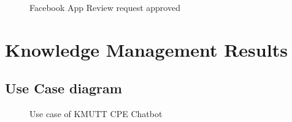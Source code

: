 \documentclass[12pt,oneside,openright,a4paper]{cpe-english-project}
\begin{document}
	\begin{figure}[!h]\centering
		\caption{Facebook App Review request approved}\label{fig:app_review_approved}
	\end{figure}

\pagebreak
\section{Knowledge Management Results}
	\subsection{Use Case diagram}
	\begin{figure}[!h]\centering
		\caption{Use case of KMUTT CPE Chatbot}\label{fig:Use case of KMUTT CPE Chatbot version2}
	\end{figure}
\pagebreak
\end{document}
